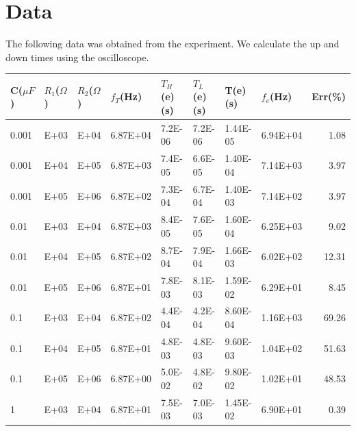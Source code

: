 \documentclass{scrartcl}
\newcommand{\1}{\mathbbm{1}}
\begin{document}
\section{Data}

The following data was obtained from the experiment. We calculate the up and down times using the oscilloscope.

\begin{table}[H]
    \centering
    \begin{tabular}{|l|l|l|l|l|l|l|l|r|}
    \hline
        \textbf{\small C($\mu F$)} & \textbf{\small$R_1$($\Omega$)} & \textbf{\small$R_2$($\Omega$)} & \textbf{\small$f_T$(Hz)} & \textbf{$T_H$ (e) (s)} & \textbf{$T_L$(e)(s)} & \textbf{T(e)(s)} & \textbf{$f_{e}$(Hz)} & \textbf{Err(\%)} \\ \hline
        0.001 & \num{E+03} & \num{E+04} & \num{6.87E+04} & \num{7.2E-06} & \num{7.2E-06} & \num{1.44E-05} & \num{6.94E+04}  & \num{1.08 }\\ 
        0.001 & \num{E+04} & \num{E+05} & \num{6.87E+03} & \num{7.4E-05} & \num{6.6E-05} & \num{1.40E-04} & \num{7.14E+03}  & \num{3.97 }\\ 
        0.001 & \num{E+05} & \num{E+06} & \num{6.87E+02} & \num{7.3E-04} & \num{6.7E-04} & \num{1.40E-03} & \num{7.14E+02}  & \num{3.97 }\\ \hline
        0.01  & \num{E+03} & \num{E+04} & \num{6.87E+03} & \num{8.4E-05} & \num{7.6E-05} & \num{1.60E-04} & \num{6.25E+03}  & \num{9.02 }\\ 
        0.01  & \num{E+04} & \num{E+05} & \num{6.87E+02} & \num{8.7E-04} & \num{7.9E-04} & \num{1.66E-03} & \num{6.02E+02}  & \num{12.31} \\
        0.01  & \num{E+05} & \num{E+06} & \num{6.87E+01} & \num{7.8E-03} & \num{8.1E-03} & \num{1.59E-02} & \num{6.29E+01}  & \num{8.45 }\\ \hline
        0.1   & \num{E+03} & \num{E+04} & \num{6.87E+02} & \num{4.4E-04} & \num{4.2E-04} & \num{8.60E-04} & \num{1.16E+03}  & \num{69.26} \\
        0.1   & \num{E+04} & \num{E+05} & \num{6.87E+01} & \num{4.8E-03} & \num{4.8E-03} & \num{9.60E-03} & \num{1.04E+02}  & \num{51.63} \\ 
        0.1   & \num{E+05} & \num{E+06} & \num{6.87E+00} & \num{5.0E-02} & \num{4.8E-02} & \num{9.80E-02} & \num{1.02E+01}  & \num{48.53} \\\hline
        1     & \num{E+03} & \num{E+04} & \num{6.87E+01} & \num{7.5E-03} & \num{7.0E-03} & \num{1.45E-02} & \num{6.90E+01}  & \num{0.39 }\\ 

\end{tabular}
\end{table}
\end{document}
